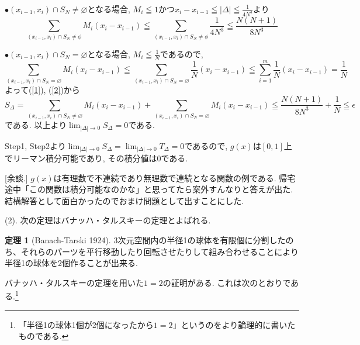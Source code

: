 \documentclass[dvipdfmx,a4paper,11pt]{article}
\theoremstyle{definition}
\newtheorem{thm}{定理}
\begin{document}
$\bullet$$(x_{i-1}, x_i) \cap S_N \neq \varnothing$となる場合, $M_i \leqq 1$かつ$x_i - x_{i-1} \leqq |\Delta| \leqq \frac{1}{4N^3}$より
\begin{equation}
\label{1}
\sum_{(x_{i-1}, x_i) \cap S_N \neq \phi} M_{i}(x_i - x_{i-1}) 
\leqq \sum_{(x_{i-1}, x_i) \cap S_N \neq \phi}  \frac{1}{4N^3}
\leqq \frac{N(N+1)}{8N^3} 
\end{equation}

$\bullet$$(x_{i-1}, x_i) \cap S_N = \varnothing$となる場合, $M_i \leqq \frac{1}{N}$であるので, 
\begin{equation}
\label{2}
\sum_{(x_{i-1}, x_i) \cap S_N = \varnothing} M_{i}(x_i - x_{i-1}) 
\leqq \sum_{(x_{i-1}, x_i) \cap S_N = \varnothing} \frac{1}{N}(x_i - x_{i-1}) 
\leqq \sum_{i=1}^{m} \frac{1}{N}(x_i - x_{i-1}) =\frac{1}{N}
\end{equation}
よって(\ref{1}), (\ref{2})から
$$
S_{\Delta}
= \sum_{(x_{i-1}, x_i) \cap S_N \neq \varnothing} M_{i}(x_i - x_{i-1}) + \sum_{(x_{i-1}, x_i) \cap S_N = \varnothing} M_{i}(x_i - x_{i-1})  \leqq \frac{N(N+1)}{8N^3} + \frac{1}{N} \leqq \epsilon
$$
である. 以上より$\lim_{|\Delta| \rightarrow 0}S_{\Delta} = 0$である.

Step1, Step2より$\lim_{|\Delta| \rightarrow 0}S_{\Delta} = \lim_{|\Delta| \rightarrow 0}T_{\Delta} = 0$であるので, $g(x)$は$[0,1]$上でリーマン積分可能であり, その積分値は0である.

\hspace{-22pt}
[余談.]
$g(x)$は有理数で不連続であり無理数で連続となる関数の例である. 帰宅途中「この関数は積分可能なのかな」と思ってたら案外すんなりと答えが出た.
結構解答として面白かったのでおまけ問題として出すことにした. 
\vspace{11pt}


(2). 次の定理はバナッハ・タルスキーの定理とよばれる.

\begin{thm}[Banach-Tarski 1924]
3次元空間内の半径1の球体を有限個に分割したのち、それらのパーツを平行移動したり回転させたりして組み合わせることにより半径1の球体を2個作ることが出来る.
\end{thm}

バナッハ・タルスキーの定理を用いた$1=2$の証明がある. 
これは次のとおりである.\footnote{「半径1の球体1個が2個になったから$1=2$」というのをより論理的に書いたものである.}
\end{document}
